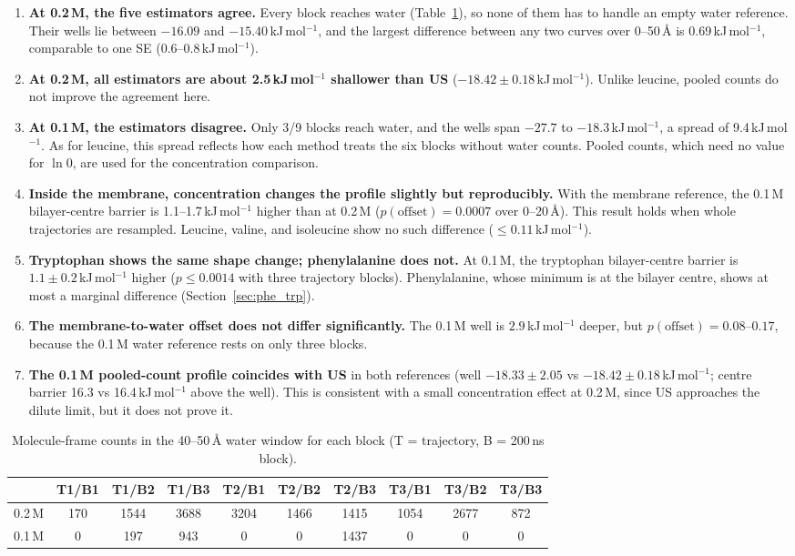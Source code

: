 \documentclass[11pt,a4paper]{article}
\newcommand{\kJ}{\,kJ\,mol$^{-1}$}
\begin{document}
\begin{enumerate}
  \item \textbf{At 0.2\,M, the five estimators agree.} Every block reaches water
  (Table~\ref{tab:water}), so none of them has to handle an empty water reference. Their
  wells lie between $-16.09$ and $-15.40$\kJ, and the largest difference between any two
  curves over 0--50\,\AA{} is 0.69\kJ, comparable to one SE (0.6--0.8\kJ).
  \item \textbf{At 0.2\,M, all estimators are about 2.5\kJ{} shallower than US}
  ($-18.42 \pm 0.18$\kJ). Unlike leucine, pooled counts do not improve the agreement here.
  \item \textbf{At 0.1\,M, the estimators disagree.} Only 3/9 blocks reach water, and the wells
  span $-27.7$ to $-18.3$\kJ, a spread of 9.4\kJ. As for leucine, this spread reflects how
  each method treats the six blocks without water counts. Pooled counts, which need no value
  for $\ln 0$, are used for the concentration comparison.
  \item \textbf{Inside the membrane, concentration changes the profile slightly but
  reproducibly.} With the membrane reference, the 0.1\,M bilayer-centre barrier is
  1.1--1.7\kJ{} higher than at 0.2\,M ($p(\text{offset}) = 0.0007$ over 0--20\,\AA). This
  result holds when whole trajectories are resampled. Leucine, valine, and isoleucine show
  no such difference ($\le 0.11$\kJ).
  \item \textbf{Tryptophan shows the same shape change; phenylalanine does not.} At 0.1\,M,
  the tryptophan bilayer-centre barrier is $1.1 \pm 0.2$\kJ{} higher ($p \le 0.0014$ with
  three trajectory blocks). Phenylalanine, whose minimum is at the bilayer centre, shows at
  most a marginal difference (Section~\ref{sec:phe_trp}).
  \item \textbf{The membrane-to-water offset does not differ significantly.} The 0.1\,M well is
  $2.9$\kJ{} deeper, but $p(\text{offset}) = 0.08$--$0.17$, because the 0.1\,M water
  reference rests on only three blocks.
  \item \textbf{The 0.1\,M pooled-count profile coincides with US} in both references
  (well $-18.33 \pm 2.05$ vs $-18.42 \pm 0.18$\kJ; centre barrier 16.3 vs 16.4\kJ{} above
  the well). This is consistent with a small concentration effect at 0.2\,M, since US
  approaches the dilute limit, but it does not prove it.
\end{enumerate}

\begin{table}[H]
\centering
\caption{Molecule-frame counts in the 40--50\,\AA{} water window for each block (T =
trajectory, B = 200\,ns block).}
\label{tab:water}
\begin{tabular}{lccccccccc}
\toprule
 & T1/B1 & T1/B2 & T1/B3 & T2/B1 & T2/B2 & T2/B3 & T3/B1 & T3/B2 & T3/B3 \\
\midrule
0.2\,M & 170 & 1544 & 3688 & 3204 & 1466 & 1415 & 1054 & 2677 & 872 \\
0.1\,M & 0 & 197 & 943 & 0 & 0 & 1437 & 0 & 0 & 0 \\
\bottomrule
\end{tabular}
\end{table}
\end{document}
